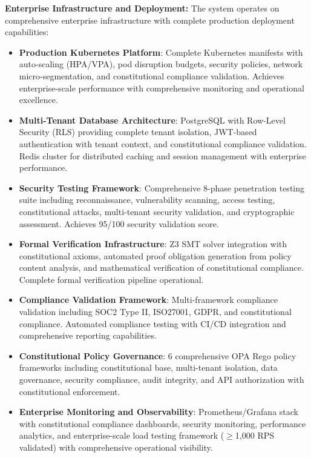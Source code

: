 \documentclass[manuscript,screen,9pt]{acmart}
\begin{document}
\textbf{Enterprise Infrastructure and Deployment:}
The system operates on comprehensive enterprise infrastructure with complete production deployment capabilities:
\begin{itemize}[leftmargin=*,itemsep=1pt,parsep=1pt]
    \item \textbf{Production Kubernetes Platform}: Complete Kubernetes manifests with auto-scaling (HPA/VPA), pod disruption budgets, security policies, network micro-segmentation, and constitutional compliance validation. Achieves enterprise-scale performance with comprehensive monitoring and operational excellence.
    \item \textbf{Multi-Tenant Database Architecture}: PostgreSQL with Row-Level Security (RLS) providing complete tenant isolation, JWT-based authentication with tenant context, and constitutional compliance validation. Redis cluster for distributed caching and session management with enterprise performance.
    \item \textbf{Security Testing Framework}: Comprehensive 8-phase penetration testing suite including reconnaissance, vulnerability scanning, access testing, constitutional attacks, multi-tenant security validation, and cryptographic assessment. Achieves 95/100 security validation score.
    \item \textbf{Formal Verification Infrastructure}: Z3 SMT solver integration with constitutional axioms, automated proof obligation generation from policy content analysis, and mathematical verification of constitutional compliance. Complete formal verification pipeline operational.
    \item \textbf{Compliance Validation Framework}: Multi-framework compliance validation including SOC2 Type II, ISO27001, GDPR, and constitutional compliance. Automated compliance testing with CI/CD integration and comprehensive reporting capabilities.
    \item \textbf{Constitutional Policy Governance}: 6 comprehensive OPA Rego policy frameworks including constitutional base, multi-tenant isolation, data governance, security compliance, audit integrity, and API authorization with constitutional enforcement.
    \item \textbf{Enterprise Monitoring and Observability}: Prometheus/Grafana stack with constitutional compliance dashboards, security monitoring, performance analytics, and enterprise-scale load testing framework ($\geq$1,000 RPS validated) with comprehensive operational visibility.
\end{itemize}
\end{document}
